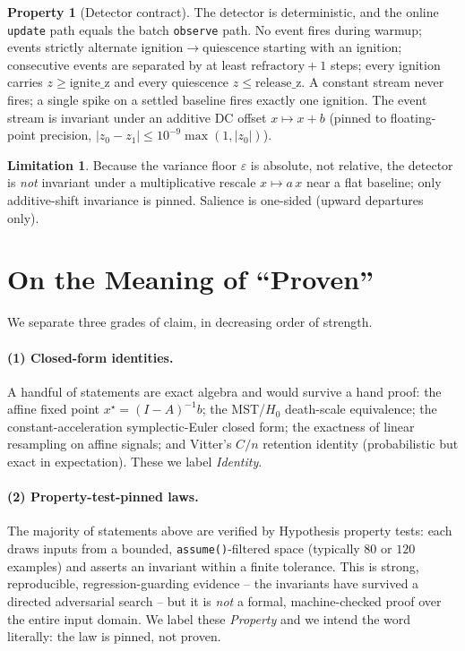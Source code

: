 \documentclass[11pt]{article}
\theoremstyle{definition}
\newtheorem{property}{Property}[section]
\newtheorem{limitation}{Limitation}[section]
\newcommand{\code}[1]{\texttt{#1}}
\newcommand{\eps}{\varepsilon}
\begin{document}
\begin{property}[Detector contract]
The detector is deterministic, and the online \code{update} path equals the
batch \code{observe} path. No event fires during warmup; events strictly
alternate ignition$\to$quiescence starting with an ignition; consecutive
events are separated by at least $\text{refractory}+1$ steps; every ignition
carries $z\ge\text{ignite\_z}$ and every quiescence $z\le\text{release\_z}$.
A constant stream never fires; a single spike on a settled baseline fires
exactly one ignition. The event stream is invariant under an additive DC
offset $x\mapsto x+b$ (pinned to floating-point precision,
$|z_0-z_1|\le 10^{-9}\max(1,|z_0|)$).
\end{property}

\begin{limitation}
Because the variance floor $\eps$ is absolute, not relative, the detector is
\emph{not} invariant under a multiplicative rescale $x\mapsto a\,x$ near a
flat baseline; only additive-shift invariance is pinned. Salience is
one-sided (upward departures only).
\end{limitation}

\section{On the Meaning of ``Proven''}\label{sec:honesty}
We separate three grades of claim, in decreasing order of strength.

\paragraph{(1) Closed-form identities.} A handful of statements are exact
algebra and would survive a hand proof: the affine fixed point
$x^\star=(I-A)^{-1}b$; the MST/$H_0$ death-scale equivalence; the
constant-acceleration symplectic-Euler closed form; the exactness of linear
resampling on affine signals; and Vitter's $C/n$ retention identity
(probabilistic but exact in expectation). These we label
\emph{Identity}.

\paragraph{(2) Property-test-pinned laws.} The majority of statements above
are verified by Hypothesis property tests: each draws inputs from a bounded,
\code{assume()}-filtered space (typically $80$ or $120$ examples) and asserts
an invariant within a finite tolerance. This is strong, reproducible,
regression-guarding evidence -- the invariants have survived a directed
adversarial search -- but it is \emph{not} a formal, machine-checked proof
over the entire input domain. We label these \emph{Property} and we
intend the word literally: the law is pinned, not proven.
\end{document}
